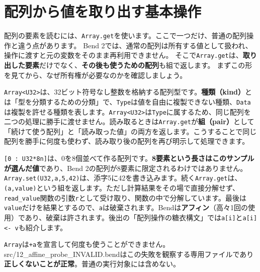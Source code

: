 \documentclass[11pt,a4paper,openany]{book}
\newcommand{\code}[1]{\texttt{#1}}
\newcommand{\file}[1]{\textsf{\color{blue}#1}}
\newcommand{\term}[1]{\textbf{#1}}
\newcommand{\readcode}[2]{}
\begin{document}
\section{配列から値を取り出す基本操作}

配列の要素を読むには、\code{Array.get}を使います。ここで一つだけ、普通の配列操作と違う点があります。
Bend 2では、通常の配列は所有する値として扱われ、操作に渡すと元の変数をそのまま再利用できません。
そこで\code{Array.get}は、\textbf{取り出した要素}だけでなく、\textbf{その後も使うための配列}も組で返します。
まずこの形を見てから、なぜ所有権が必要なのかを確認しましょう。

\code{Array<U32>}は、32ビット符号なし整数を格納する配列型です。\term{種類（kind）}とは「型を分類するための分類」で、\code{Type}は値を自由に複製できない種類、\code{Data}は複製を許せる種類を表します。\code{Array<U32>}は\code{Type}に属するため、同じ配列を二つの処理に勝手に渡せません。読み取るときは\code{Array.get}が\term{組（pair）}として「続けて使う配列」と「読み取った値」の両方を返します。こうすることで同じ配列を勝手に何度も使わず、読み取り後の配列を再び明示して処理できます。

\readcode{04_array.bend}{書き換えと読み出し（04\_array.bend）}
\code{[0 : U32*8n]}は、0を8個並べて作る配列です。\textbf{8要素という長さはこのサンプルが選んだ値}であり、Bend 2の配列が8要素に限定されるわけではありません。\code{Array.set(U32,a,5,42)}は、添字5に42を書き込みます。続く\code{Array.get}は、\code{(a,value)}という組を返します。ただし計算結果をその場で直接分解せず、\code{read\_value}関数の引数\code{r}として受け取り、関数の中で分解しています。最後は\code{value}だけを結果とするので、\code{a}は破棄されます。Bendは\textbf{アフィン}（高々1回の使用）であり、破棄は許されます。後出の「配列操作の糖衣構文」では\code{a[i]}と\code{a[i] <- v}も紹介します。

\begin{cautionbox}
\code{Array}は\code{+a}を宣言して何度も使うことができません。\file{src/12\_affine\_probe\_INVALID.bend}はこの失敗を観察する専用ファイルであり\textbf{正しくないことが正常}。普通の実行対象には含めない。
\end{cautionbox}
\end{document}
